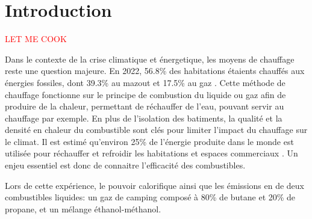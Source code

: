 \section{Introduction}

\textcolor{red}{LET ME COOK }

Dans le contexte de la crise climatique et énergetique, les moyens de chauffage reste une question majeure. En 2022, 56.8\% des habitations étaients chauffés aux énergies fossiles, dont 39.3\% au mazout et 17.5\% au gaz \cite{chauffage}. Cette méthode de chauffage fonctionne sur le principe de combustion du liquide ou gaz afin de produire de la chaleur, permettant de réchauffer de l'eau, pouvant servir au chauffage par exemple. En plus de l'isolation des batiments, la qualité et la densité en chaleur du combustible sont clés pour limiter l'impact du chauffage sur le climat. Il est estimé qu'environ 25\% de l'énergie produite dans le monde est utilisée pour réchauffer et refroidir les habitations et espaces commerciaux \cite{energie-chauffage}. Un enjeu essentiel est donc de connaitre l'efficacité des combustibles.

Lors de cette expérience, le pouvoir calorifique ainsi que les émissions en  de deux combustibles liquides: un gaz de camping composé à 80\% de butane et 20\% de propane, et un mélange éthanol-méthanol.